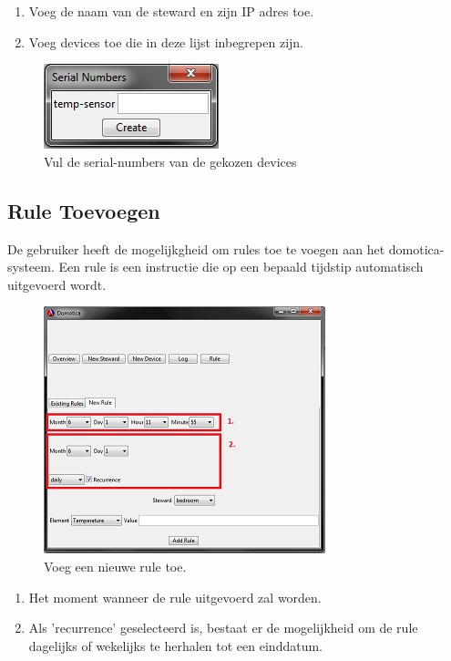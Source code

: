 \documentclass{article}
\begin{document}
		\begin{enumerate}
			\item Voeg de naam van de steward en zijn IP adres toe.
			\item Voeg devices toe die in deze lijst inbegrepen zijn.
		\end{enumerate}
	
		\begin{figure}
			\begin{center}
				\includegraphics{../screenshot/new-steward-confirmation.jpg}
			\end{center}
			\caption{Vul de serial-numbers van de gekozen devices}
			\label{new-steward-confirmation}
		\end{figure}

		\subsection{Rule Toevoegen}
		\label{add-rule}
		De gebruiker heeft de mogelijkgheid om rules toe te voegen aan het domotica-systeem. Een rule is een instructie die op een bepaald tijdstip automatisch uitgevoerd wordt.
		
		\newpage
		\begin{figure}
			\begin{center}
				\includegraphics{../screenshot/new-rule.jpg}
			\end{center}
			\caption{Voeg een nieuwe rule toe.}
			\label{new-rule}
		\end{figure}
	
		\begin{enumerate}
			\item Het moment wanneer de rule uitgevoerd zal worden.
			\item Als 'recurrence' geselecteerd is, bestaat er de mogelijkheid om de rule dagelijks of wekelijks te herhalen tot een einddatum.
		\end{enumerate}
		
\end{document}

